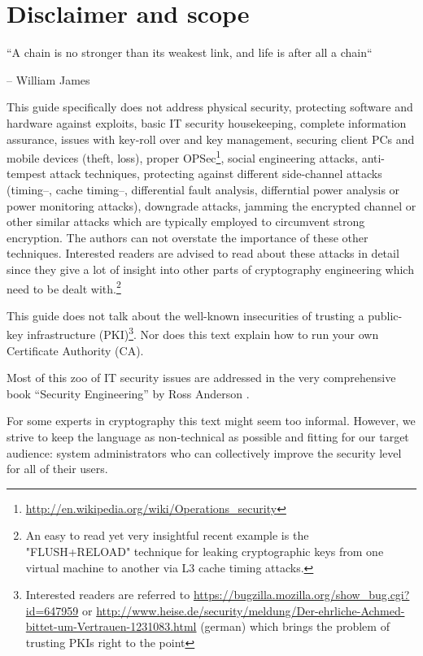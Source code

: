 \section{Disclaimer and scope}
\label{section:disclaimer}

\epigraph{``A chain is no stronger than its weakest link, and life is after all a chain``}{-- William James}


This guide specifically does not address physical security, protecting software
and hardware against exploits, basic IT security housekeeping, complete
information assurance, issues with key-roll over and key management, securing
client PCs and mobile devices (theft, loss), proper
OPSec\footnote{\url{http://en.wikipedia.org/wiki/Operations_security}}, social
engineering attacks, anti-tempest\cite{Wikipedia:Tempest} attack techniques,
protecting against different side-channel attacks (timing--, cache timing--,
differential fault analysis, differntial power analysis or power monitoring
attacks), downgrade attacks, jamming the encrypted channel or other similar
attacks which are typically employed to circumvent strong encryption.  The
authors can not overstate the importance of these other techniques.  Interested
readers are advised to read about these attacks in detail since they give a lot
of insight into other parts of cryptography engineering which need to be dealt
with.\footnote{An easy to read yet very insightful recent example is the
"FLUSH+RELOAD" technique \cite{yarom2013flush+} for leaking cryptographic keys
from one virtual machine to another via L3 cache timing attacks.}

This guide does not talk about the well-known insecurities of trusting a
public-key infrastructure (PKI)\footnote{Interested readers are referred to
\url{https://bugzilla.mozilla.org/show_bug.cgi?id=647959} or
\url{http://www.heise.de/security/meldung/Der-ehrliche-Achmed-bittet-um-Vertrauen-1231083.html}
(german) which brings the problem of trusting PKIs right to the point}. Nor
does this text explain how to run your own Certificate Authority (CA). 

Most of this zoo of IT security issues are addressed in the very comprehensive
book ``Security Engineering'' by Ross Anderson \cite{anderson2008security}. 

For some experts in cryptography this text might seem too informal. However, we
strive to keep the language as non-technical as possible and fitting for our
target audience: system administrators who can collectively improve the
security level for all of their users. 




